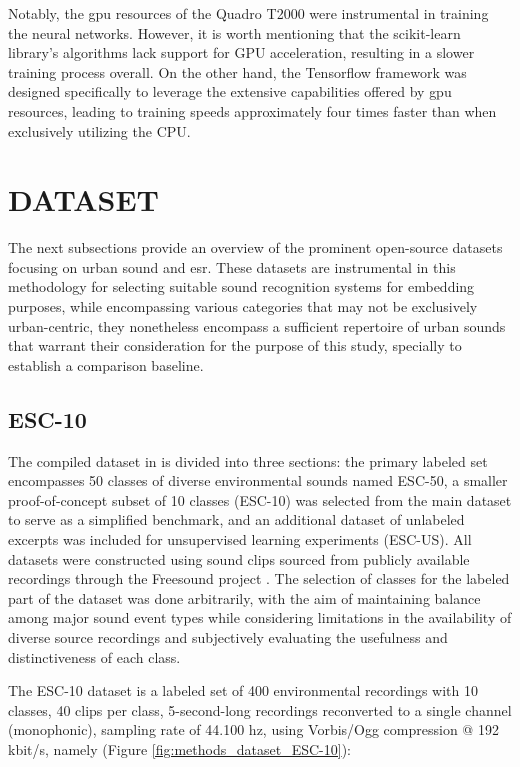 Notably, the \gls{gpu} resources of the Quadro T2000 were instrumental in training the neural networks. However, it is worth mentioning that the scikit-learn library's algorithms lack support for GPU acceleration, resulting in a slower training process overall. On the other hand, the Tensorflow framework was designed specifically to leverage the extensive capabilities offered by \gls{gpu} resources, leading to training speeds approximately four times faster than when exclusively utilizing the CPU.


\section{DATASET}
\label{sec:methods_dataset}

The next subsections provide an overview of the prominent open-source datasets focusing on urban sound and \gls{esr}. These datasets are instrumental in this methodology for selecting suitable sound recognition systems for embedding purposes, while encompassing various categories that may not be exclusively urban-centric, they nonetheless encompass a sufficient repertoire of urban sounds that warrant their consideration for the purpose of this study, specially to establish a comparison baseline.

\subsection{ESC-10}
\label{subsec:dataset_ESC-10}

The compiled dataset in \textcite{PiczakESC2015} is divided into three sections: the primary labeled set encompasses 50 classes of diverse environmental sounds named ESC-50, a smaller proof-of-concept subset of 10 classes (ESC-10) was selected from the main dataset to serve as a simplified benchmark, and an additional dataset of unlabeled excerpts was included for unsupervised learning experiments (ESC-US). All datasets were constructed using sound clips sourced from publicly available recordings through the Freesound project \cite{Font_freesound2013}. The selection of classes for the labeled part of the dataset was done arbitrarily, with the aim of maintaining balance among major sound event types while considering limitations in the availability of diverse source recordings and subjectively evaluating the usefulness and distinctiveness of each class.

The ESC-10 dataset is a labeled set of 400 environmental recordings with 10 classes, 40 clips per class, 5-second-long recordings reconverted to a single channel (monophonic), sampling rate of 44.100 \gls{hz},  using Vorbis/Ogg compression @ 192 \gls{k}bit/\gls{s}, namely (Figure \ref{fig:methods_dataset_ESC-10}):

